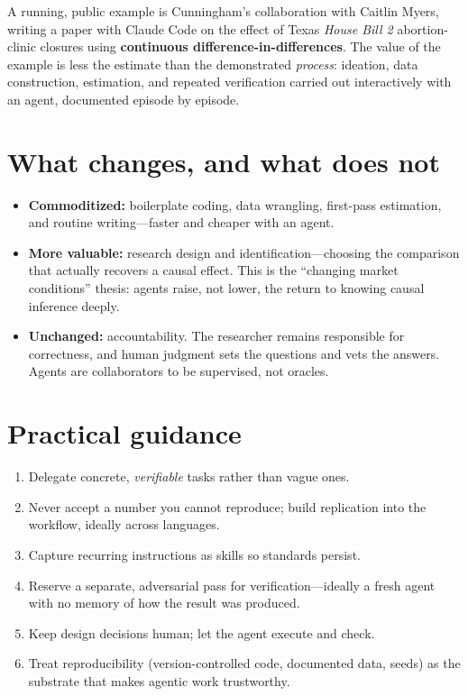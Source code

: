 \documentclass[11pt]{article}
\begin{document}
A running, public example is Cunningham's collaboration with Caitlin Myers,
writing a paper with Claude Code on the effect of Texas \emph{House Bill 2}
abortion-clinic closures using \textbf{continuous difference-in-differences}.
The value of the example is less the estimate than the demonstrated
\emph{process}: ideation, data construction, estimation, and repeated
verification carried out interactively with an agent, documented episode by
episode.

\section{What changes, and what does not}

\begin{itemize}
  \item \textbf{Commoditized:} boilerplate coding, data wrangling, first-pass
    estimation, and routine writing---faster and cheaper with an agent.
  \item \textbf{More valuable:} research design and identification---choosing
    the comparison that actually recovers a causal effect. This is the
    ``changing market conditions'' thesis: agents raise, not lower, the return
    to knowing causal inference deeply.
  \item \textbf{Unchanged:} accountability. The researcher remains responsible
    for correctness, and human judgment sets the questions and vets the
    answers. Agents are collaborators to be supervised, not oracles.
\end{itemize}

\section{Practical guidance}

\begin{enumerate}[label=\arabic*.]
  \item Delegate concrete, \emph{verifiable} tasks rather than vague ones.
  \item Never accept a number you cannot reproduce; build replication into the
    workflow, ideally across languages.
  \item Capture recurring instructions as skills so standards persist.
  \item Reserve a separate, adversarial pass for verification---ideally a fresh
    agent with no memory of how the result was produced.
  \item Keep design decisions human; let the agent execute and check.
  \item Treat reproducibility (version-controlled code, documented data, seeds)
    as the substrate that makes agentic work trustworthy.
\end{enumerate}
\end{document}
